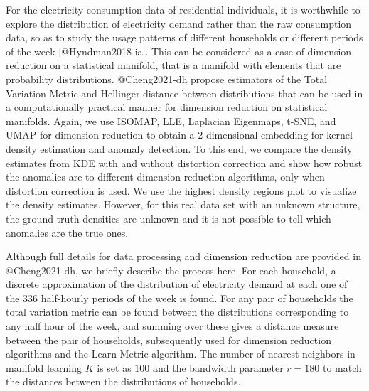 \documentclass[
]{article}
\begin{document}
For the electricity consumption data of residential individuals, it is
worthwhile to explore the distribution of electricity demand rather than
the raw consumption data, so as to study the usage patterns of different
households or different periods of the week {[}@Hyndman2018-ia{]}. This
can be considered as a case of dimension reduction on a statistical
manifold, that is a manifold with elements that are probability
distributions. @Cheng2021-dh propose estimators of the Total Variation
Metric and Hellinger distance between distributions that can be used in
a computationally practical manner for dimension reduction on
statistical manifolds. Again, we use ISOMAP, LLE, Laplacian Eigenmaps,
t-SNE, and UMAP for dimension reduction to obtain a \(2\)-dimensional
embedding for kernel density estimation and anomaly detection. To this
end, we compare the density estimates from KDE with and without
distortion correction and show how robust the anomalies are to different
dimension reduction algorithms, only when distortion correction is used.
We use the highest density regions plot to visualize the density
estimates. However, for this real data set with an unknown structure,
the ground truth densities are unknown and it is not possible to tell
which anomalies are the true ones.

Although full details for data processing and dimension reduction are
provided in @Cheng2021-dh, we briefly describe the process here. For
each household, a discrete approximation of the distribution of
electricity demand at each one of the \(336\) half-hourly periods of the
week is found. For any pair of households the total variation metric can
be found between the distributions corresponding to any half hour of the
week, and summing over these gives a distance measure between the pair
of households, subsequently used for dimension reduction algorithms and
the Learn Metric algorithm. The number of nearest neighbors in manifold
learning \(K\) is set as \(100\) and the bandwidth parameter \(r=180\)
to match the distances between the distributions of households.
\end{document}
